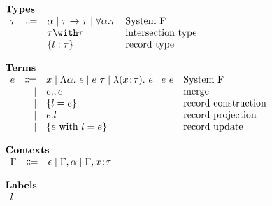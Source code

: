 \[
\begin{array}{l}

  \textbf{Types} \\
  \begin{array}{rrll}
    \ty & \Coloneqq & \alpha \mid \ty \to \ty \mid \forall \alpha. \ty & \text{System F} \\
        & \mid      & \ty \intersects \ty                              & \text{intersection type} \\
        & \mid      & \recty l \ty                                     & \text{record type}
  \end{array} \\ \\

  \textbf{Terms} \\
  \begin{array}{rrll}
    e & \Coloneqq & x \mid \Abs \alpha e \mid \app e \ty \mid \abs {\rel x \ty} e \mid \app e e & \text{System F} \\
      & \mid      & e \dcomma e   & \text{merge} \\
      & \mid      & \reccon l e   & \text{record construction} \\
      & \mid      & e.l           & \text{record projection} \\
      & \mid      & \recupd e l e & \text{record update}
  \end{array} \\ \\

  \textbf{Contexts} \\
  \begin{array}{rrl}
    \Gamma & \Coloneqq & \epsilon \mid \Gamma, \alpha \mid \Gamma, \rel x \ty
  \end{array} \\ \\

  \textbf{Labels} \\
  \begin{array}{r}
    l
  \end{array}

\end{array}
\]
